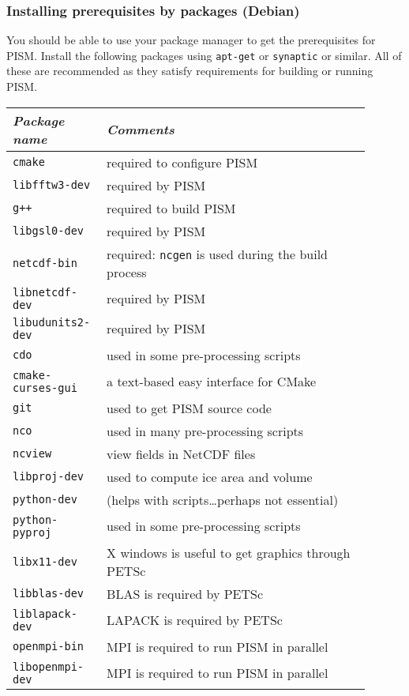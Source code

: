 \documentclass[titlepage,letterpaper,final]{scrartcl}
\begin{document}
\subsubsection{Installing prerequisites by packages (Debian)}
\label{sec:deb-libraries-by-hand}

You should be able to use your package manager to get the prerequisites for PISM.
Install the following packages using \texttt{apt-get} or \texttt{synaptic} or similar.
All of these are recommended as they satisfy requirements for building or running PISM.
\begin{center}
  \begin{tabular*}{0.9\linewidth}{p{0.2\linewidth}p{0.7\linewidth}}
    \toprule
    \emph{Package name} & \emph{Comments}\\
    \midrule
    \texttt{cmake} & required to configure PISM \\
    \texttt{libfftw3-dev} & required by PISM \\
    \texttt{g++} & required to build PISM \\
    \texttt{libgsl0-dev} & required by PISM \\
    \texttt{netcdf-bin} & required: \texttt{ncgen} is used during the build process \\
    \texttt{libnetcdf-dev} & required by PISM \\
    \texttt{libudunits2-dev} & required by PISM \\
    \midrule
    \texttt{cdo} & used in some pre-processing scripts \\
    \texttt{cmake-curses-gui} & a text-based easy interface for CMake \\
    \texttt{git} & used to get PISM source code \\
    \texttt{nco} & used in many pre-processing scripts \\
    \texttt{ncview} & view fields in NetCDF files \\
    \texttt{libproj-dev} & used to compute ice area and volume \\
    \texttt{python-dev} & (helps with scripts\dots perhaps not essential) \\
    \texttt{python-pyproj} & used in some pre-processing scripts \\
    \texttt{libx11-dev} & X windows is useful to get graphics through PETSc \\
    \midrule
    \texttt{libblas-dev} & BLAS is required by PETSc \\
    \texttt{liblapack-dev} & LAPACK is required by PETSc \\
    \texttt{openmpi-bin} & MPI is required to run PISM in parallel \\
    \texttt{libopenmpi-dev} & MPI is required to run PISM in parallel \\
    \bottomrule
  \end{tabular*}
\end{center}
\end{document}
